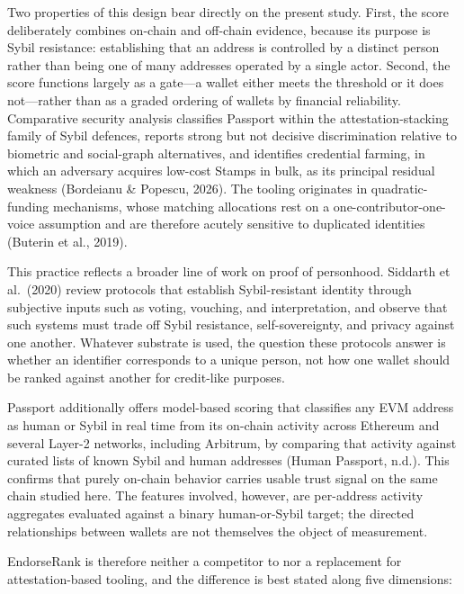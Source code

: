 Two properties of this design bear directly on the present study. First, the score deliberately combines on-chain and off-chain evidence, because its purpose is Sybil resistance: establishing that an address is controlled by a distinct person rather than being one of many addresses operated by a single actor. Second, the score functions largely as a gate---a wallet either meets the threshold or it does not---rather than as a graded ordering of wallets by financial reliability. Comparative security analysis classifies Passport within the attestation-stacking family of Sybil defences, reports strong but not decisive discrimination relative to biometric and social-graph alternatives, and identifies credential farming, in which an adversary acquires low-cost Stamps in bulk, as its principal residual weakness (Bordeianu \& Popescu, 2026). The tooling originates in quadratic-funding mechanisms, whose matching allocations rest on a one-contributor-one-voice assumption and are therefore acutely sensitive to duplicated identities (Buterin et al., 2019).


This practice reflects a broader line of work on proof of personhood. Siddarth et al.\ (2020) review protocols that establish Sybil-resistant identity through subjective inputs such as voting, vouching, and interpretation, and observe that such systems must trade off Sybil resistance, self-sovereignty, and privacy against one another. Whatever substrate is used, the question these protocols answer is whether an identifier corresponds to a unique person, not how one wallet should be ranked against another for credit-like purposes.


Passport additionally offers model-based scoring that classifies any EVM address as human or Sybil in real time from its on-chain activity across Ethereum and several Layer-2 networks, including Arbitrum, by comparing that activity against curated lists of known Sybil and human addresses (Human Passport, n.d.). This confirms that purely on-chain behavior carries usable trust signal on the same chain studied here. The features involved, however, are per-address activity aggregates evaluated against a binary human-or-Sybil target; the directed relationships between wallets are not themselves the object of measurement.


EndorseRank is therefore neither a competitor to nor a replacement for attestation-based tooling, and the difference is best stated along five dimensions:


